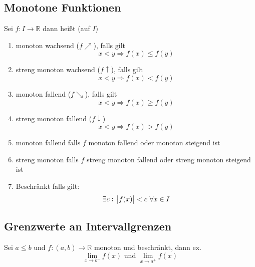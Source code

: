 \documentclass[10pt]{article}
\newcommand{\R}{\mathbb{R}}
\begin{document}
    \subsection{Monotone Funktionen}
    Sei $f: I \rightarrow \R$ dann heißt (auf $I$)
    \begin{enumerate}[label= (\alph*)]
        \item monoton wachsend ($f \nearrow$), falls gilt
            \begin{equation*}
                x < y \Rightarrow f(x) \leq f(y)
            \end{equation*}
        \item streng monoton wachsend ($f \uparrow$), falls gilt
            \begin{equation*}
                x < y \Rightarrow f(x) < f(y)
            \end{equation*}
        \item monoton fallend ($f \searrow$), falls gilt
            \begin{equation*}
                x < y \Rightarrow f(x) \geq f(y)
            \end{equation*}
        \item streng monoton fallend ($f \downarrow$)
            \begin{equation*}
                x < y \Rightarrow f(x) > f(y)
            \end{equation*}
        \item monoton fallend falls $f$ monoton fallend oder monoton steigend ist
        \item streng monoton falls $f$ streng monoton fallend oder streng monoton
            steigend ist
        \item Beschränkt falls gilt:
            \begin{equation*}
                \exists c:\ \abs{f(x)} < c\ \forall x \in I
            \end{equation*}
    \end{enumerate}

    \subsection{Grenzwerte an Intervallgrenzen}
    Sei $a \leq b$ und $f: (a, b) \rightarrow \R$ monoton und beschränkt, dann
    ex.
    \begin{equation*}
        \lim_{x \rightarrow b^-} f(x) \text{ und } \lim_{x \rightarrow a^+} f(x)
    \end{equation*}
\end{document}
